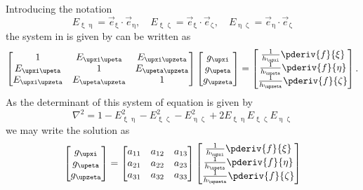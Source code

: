 Introducing the notation
\begin{equation*}
	E_{\upxi\upeta} = \vec{e}_{\upxi}\cdot\vec{e}_{\upeta},\quad E_{\upxi\upzeta} = \vec{e}_{\upxi}\cdot\vec{e}_{\upzeta},\quad E_{\upeta\upzeta} = \vec{e}_{\upeta}\cdot\vec{e}_{\upzeta}
\end{equation*}
the system in  is given by can be written as
\begin{equation*}
	\begin{bmatrix}
		1 & E_{\upxi\upeta} & E_{\upxi\upzeta}\\
		E_{\upxi\upeta} & 1 & E_{\upeta\upzeta}\\
		E_{\upxi\upzeta} & E_{\upeta\upzeta} & 1\\
	\end{bmatrix}\begin{bmatrix}
		g_{\upxi}\\
		g_{\upeta}\\
		g_{\upzeta}
	\end{bmatrix} = \begin{bmatrix}
	\frac{1}{h_{\upxi}} \pderiv{f}{\xi}\\
	\frac{1}{h_{\upeta}} \pderiv{f}{\eta}\\
	\frac{1}{h_{\upzeta}} \pderiv{f}{\zeta}\end{bmatrix}.
\end{equation*}
As the determinant of this system of equation is given by
\begin{equation*}
	\nabla^2 = 1 - E_{\upxi\upeta}^2 - E_{\upxi\upzeta}^2 - E_{\upeta\upzeta}^2 + 2E_{\upxi\upeta}E_{\upxi\upzeta}E_{\upeta\upzeta}
\end{equation*}
we may write the solution as
\begin{align*}
\begin{bmatrix}
	g_{\upxi}\\
	g_{\upeta}\\
	g_{\upzeta}
\end{bmatrix} = \begin{bmatrix}
	a_{11} & a_{12} & a_{13}\\
	a_{21} & a_{22} & a_{23}\\
	a_{31} & a_{32} & a_{33}
\end{bmatrix} \begin{bmatrix}
	\frac{1}{h_{\upxi}} \pderiv{f}{\xi}\\
	\frac{1}{h_{\upeta}} \pderiv{f}{\eta}\\
	\frac{1}{h_{\upzeta}} \pderiv{f}{\zeta}
\end{bmatrix}
\end{align*}
